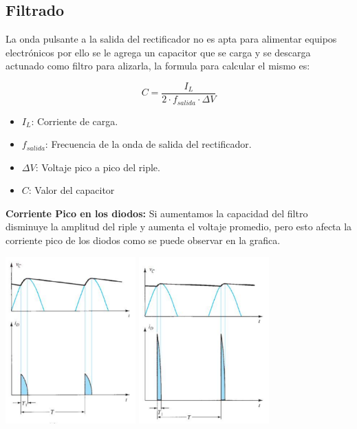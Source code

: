 \subsection{Filtrado}
La onda pulsante a la salida del rectificador no es apta para alimentar
equipos electrónicos por ello se le agrega un capacitor que se carga y se descarga actunado como filtro para alizarla, la formula para calcular el mismo es:

\begin{equation*}
    C = \frac{I_L}{2 \cdot f_{salida} \cdot \Delta V}
\end{equation*}
\begin{itemize}
    \item $I_L$: Corriente de carga.
    \item $f_{salida}$: Frecuencia de la onda de salida del rectificador.
    \item $\Delta V$: Voltaje pico a pico del riple.
    \item $C$: Valor del capacitor
\end{itemize}

\sangria{} \textbf{Corriente Pico en los diodos:}
\sangria{} Si aumentamos la capacidad del filtro disminuye la amplitud del riple y
aumenta el voltaje promedio, pero esto afecta la corriente pico de los
diodos como se puede observar en la grafica.

\begin{center}
    \includegraphics[width=5cm]{./imagenes/Dyc.png}
    \includegraphics[width=5cm]{./imagenes/Dyc1.png}
\end{center}

